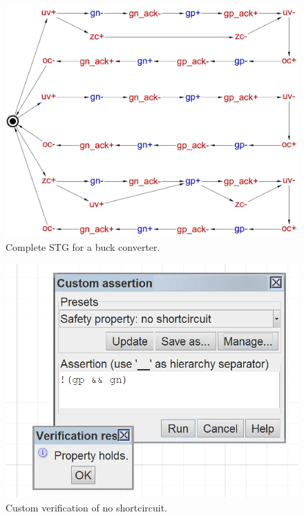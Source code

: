 \documentclass[british, journal]{IEEEtran}
\begin{document}
\begin{figure}[t]
\begin{centering}
\includegraphics[scale=0.23]{Images/stg-buck-scenarios_merged}
\par\end{centering}
\begin{centering}
\protect\caption{\label{fig:buck STG}Complete STG for a buck converter.}
\par\end{centering}
\vspace{-3mm}
\end{figure}

\begin{figure}[h]
\begin{centering}
\includegraphics[scale=0.75]{Images/screenshot-custom-assertion}
\par\end{centering}
\begin{centering}
\protect\caption{\label{fig:custom_assertion}Custom verification of no shortcircuit.}
\par\end{centering}
\vspace{-3mm}
\end{figure}
\end{document}
